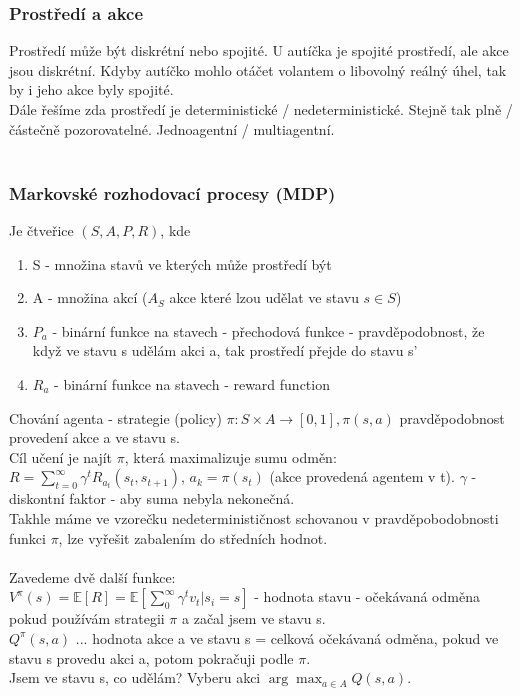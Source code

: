 \documentclass{article}
\begin{document}
\subsubsection*{Prostředí a akce}
Prostředí může být diskrétní nebo spojité. U autíčka je spojité prostředí, ale akce jsou diskrétní. Kdyby autíčko mohlo otáčet volantem
o libovolný reálný úhel, tak by i jeho akce byly spojité.\\
Dále řešíme zda prostředí je deterministické / nedeterministické. Stejně tak plně / částečně pozorovatelné. Jednoagentní / multiagentní.\\\\


\subsubsection*{Markovské rozhodovací procesy (MDP)}
Je čtveřice $(S,A,P,R)$, kde \\
\begin{enumerate}
    \item S - množina stavů ve kterých může prostředí být
    \item A - množina akcí ($A_{S}$ akce které lzou udělat ve stavu $s \in S$)
    \item $P_{a}$ - binární funkce na stavech - přechodová funkce - pravděpodobnost, že když ve stavu s udělám akci a, tak prostředí přejde do stavu s'
    \item $R_{a}$ - binární funkce na stavech - reward function
\end{enumerate}
Chování agenta - strategie (policy) $\pi : S \times A \rightarrow [0,1], \pi (s,a)$ pravděpodobnost provedení akce a ve stavu s.\\
Cíl učení je najít $\pi$, která maximalizuje sumu odměn: $R = \sum_{t=0}^{\infty}\gamma^{t}R_{a_{t}}(s_{t},s_{t+1})$, 
$a_{k} = \pi (s_{t})$ (akce provedená agentem v t). $\gamma$ - diskontní faktor - aby suma nebyla nekonečná.\\
Takhle máme ve vzorečku nedeterminističnost schovanou v pravděpobodobnosti funkci $\pi$, lze vyřešit zabalením do středních hodnot.\\\\

Zavedeme dvě další funkce:\\
$V^{\pi}(s) = \mathbb{E}[R] = \mathbb{E}[\sum_{0}^{\infty} \gamma^{t} v_{t} | s_{i} = s]$ - hodnota stavu - očekávaná odměna pokud používám
strategii $\pi$ a začal jsem ve stavu s.\\
$Q^{\pi}(s,a)$ ... hodnota akce a ve stavu s = celková očekávaná odměna, pokud ve stavu s provedu akci a, potom pokračuji podle $\pi$.\\
Jsem ve stavu s, co udělám? Vyberu akci $\arg\max_{a \in A}Q(s,a)$.\\\\
\end{document}
